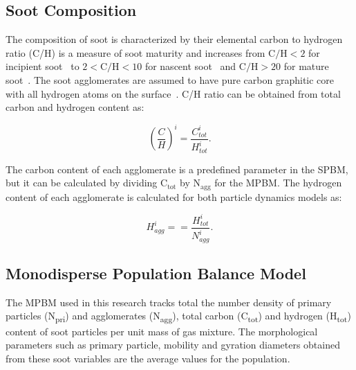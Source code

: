 \subsection{Soot Composition}
The composition of soot is characterized by their elemental carbon to hydrogen ratio (C/H) is a measure of soot maturity and increases from $\mathrm{C/H<2}$ for incipient soot~\citep{ciajolo1998spectroscopic} to $\mathrm{2<C/H<10}$ for nascent soot~\citep{betrancourt2017investigation} and $\mathrm{C/H>20}$ for mature soot~\citep{michelsen2017probing}. The soot agglomerates are assumed to have pure carbon graphitic core~\citep{kholghy2016core} with all hydrogen atoms on the surface~\citep{blanquart2009analyzing}. C/H ratio can be obtained from total carbon and hydrogen content as:

\begin{equation}
	\left(
		\frac{C}{H}
	\right)^i
	=\frac{C^i_{tot}}{H^i_{tot}}   
	\label{eqn:CtoH}.
\end{equation}

The carbon content of each agglomerate is a predefined parameter in the SPBM, but it can be calculated by dividing $\mathrm{C_{tot}}$ by $\mathrm{N_{agg}}$ for the MPBM. The hydrogen content of each agglomerate is calculated for both particle dynamics models as:

\begin{equation}
	H^i_{agg} = 
	=\frac{H^i_{tot}}{N^i_{agg}}   
	\label{eqn:Hagg}.
\end{equation}


\subsection{Monodisperse Population Balance Model}
The MPBM used in this research tracks total the number density of primary particles (N\textsubscript{pri}) and agglomerates (N\textsubscript{agg}), total carbon (C\textsubscript{tot}) and hydrogen (H\textsubscript{tot}) content of soot particles per unit mass of gas mixture. The morphological parameters such as primary particle, mobility and gyration diameters obtained from these soot variables are the average values for the population.

